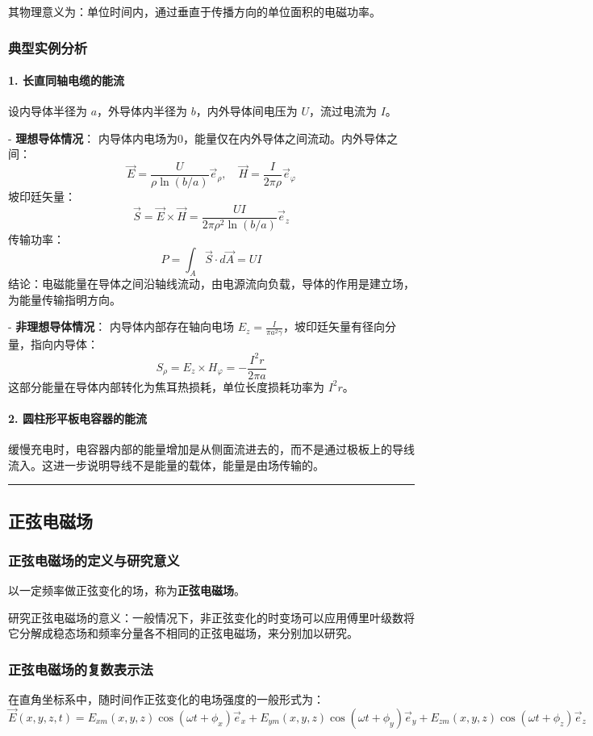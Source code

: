 其物理意义为：单位时间内，通过垂直于传播方向的单位面积的电磁功率。

\subsubsection{典型实例分析}
\paragraph{1. 长直同轴电缆的能流}
设内导体半径为 $a$，外导体内半径为 $b$，内外导体间电压为 $U$，流过电流为 $I$。

- \textbf{理想导体情况}：
  内导体内电场为0，能量仅在内外导体之间流动。内外导体之间：
  \[
  \vec{E} = \frac{U}{\rho \ln(b/a)} \vec{e}_\rho, \quad
  \vec{H} = \frac{I}{2\pi\rho} \vec{e}_\varphi
  \]
  坡印廷矢量：
  \[
  \vec{S} = \vec{E} \times \vec{H} = \frac{UI}{2\pi\rho^2 \ln(b/a)} \vec{e}_z
  \]
  传输功率：
  \[
  P = \int_{A} \vec{S} \cdot d\vec{A} = UI
  \]
  结论：电磁能量在导体之间沿轴线流动，由电源流向负载，导体的作用是建立场，为能量传输指明方向。

- \textbf{非理想导体情况}：
  内导体内部存在轴向电场 $E_z = \frac{I}{\pi a^2 \gamma}$，坡印廷矢量有径向分量，指向内导体：
  \[
  S_\rho = E_z \times H_\varphi = -\frac{I^2 r}{2\pi a}
  \]
  这部分能量在导体内部转化为焦耳热损耗，单位长度损耗功率为 $I^2 r$。

\paragraph{2. 圆柱形平板电容器的能流}
缓慢充电时，电容器内部的能量增加是从侧面流进去的，而不是通过极板上的导线流入。这进一步说明导线不是能量的载体，能量是由场传输的。

\vspace{0.8cm}\hrule\vspace{0.8cm}

\subsection{正弦电磁场}
\subsubsection{正弦电磁场的定义与研究意义}
以一定频率做正弦变化的场，称为\textbf{正弦电磁场}。

研究正弦电磁场的意义：一般情况下，非正弦变化的时变场可以应用傅里叶级数将它分解成稳态场和频率分量各不相同的正弦电磁场，来分别加以研究。

\subsubsection{正弦电磁场的复数表示法}
在直角坐标系中，随时间作正弦变化的电场强度的一般形式为：
\[
\vec{E}(x,y,z,t) = E_{xm}(x,y,z)\cos(\omega t + \phi_x)\vec{e}_x + E_{ym}(x,y,z)\cos(\omega t + \phi_y)\vec{e}_y + E_{zm}(x,y,z)\cos(\omega t + \phi_z)\vec{e}_z
\]

